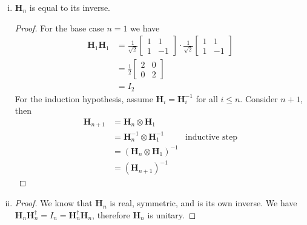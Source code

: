 \documentclass[11pt]{article}
\newenvironment{solution}{\begin{mdframed}[skipabove=\baselineskip,innertopmargin=\baselineskip,innerbottommargin=\baselineskip]
  }{\end{mdframed}}
\begin{document}
\begin{solution}
\begin{enumerate}[(i)]
    \item $\textbf{H}_n$ is equal to its inverse.
    \begin{proof}
    For the base case $n=1$ we have \begin{align*}
        \textbf{H}_1\textbf{H}_1 &=
        \frac{1}{\sqrt{2}} \begin{bmatrix}1 & 1 \\ 1 & -1 \end{bmatrix} \cdot \frac{1}{\sqrt{2}} \begin{bmatrix}1 & 1 \\ 1 & -1 \end{bmatrix} \\
        &= \frac{1}{2} \begin{bmatrix}2 & 0 \\ 0 & 2 \end{bmatrix} \\
        &= I_2
    \end{align*}
    For the induction hypothesis, assume $\textbf{H}_i = \textbf{H}_i^{-1}$ for all $i \leq n$. Consider $n+1$, then \begin{align*}
        \textbf{H}_{n+1} &= \textbf{H}_{n} \otimes \textbf{H}_{1} \\
        &= \textbf{H}_{n}^{-1} \otimes \textbf{H}_{1}^{-1} & \text{inductive step}\\
        &= (\textbf{H}_{n} \otimes \textbf{H}_{1})^{-1} \\
        &= (\textbf{H}_{n+1})^{-1}
    \end{align*}
    \end{proof}
    
    \item\begin{proof}
    We know that $\textbf{H}_n$ is real, symmetric, and is its own inverse. We have $\textbf{H}_n\textbf{H}_n^{\dagger} = I_n = \textbf{H}_n^{\dagger}\textbf{H}_n$, therefore $\textbf{H}_n$ is unitary.
    \end{proof}
\end{enumerate}
\end{solution}


 
 
 
\end{document}
